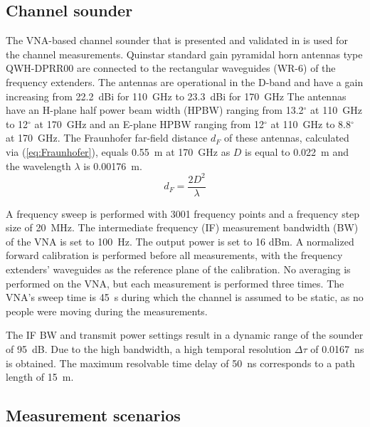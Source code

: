 \documentclass[preprint]{rsl}
\begin{document}
\subsection{Channel sounder}

The VNA-based channel sounder that is presented and validated in \cite{DeBeelde2021_eucap} is used for the channel measurements.
Quinstar standard gain pyramidal horn antennas type QWH-DPRR00 are connected to the rectangular waveguides (WR-6) of the frequency extenders. 
The antennas are operational in the D-band and have a gain increasing from 22.2~dBi for 110~GHz to 23.3~dBi for 170~GHz
The antennas have an H-plane half power beam width (HPBW) ranging from 13.2$^{\circ}$ at 110~GHz to 12$^{\circ}$ at 170~GHz and an E-plane HPBW ranging from 12$^{\circ}$ at 110~GHz to 8.8$^{\circ}$ at 170~GHz. 
The Fraunhofer far-field distance $d_F$ of these antennas, calculated via (\ref{eq:Fraunhofer}), equals 0.55~m at 170~GHz as $D$ is equal to 0.022~m and the wavelength $\lambda$ is 0.00176~m.
\begin{equation}
\label{eq:Fraunhofer}
d_F = \frac{2 D^2}{\lambda}
\end{equation}

A frequency sweep is performed with 3001 frequency points and a frequency step size of 20~MHz. 
The intermediate frequency (IF) measurement bandwidth (BW) of the VNA is set to 100~Hz. 
The output power is set to 16 dBm.
A normalized forward calibration is performed before all measurements, with the frequency extenders' waveguides as the reference plane of the calibration. 
No averaging is performed on the VNA, but each measurement is performed three times.
The VNA's sweep time is 45~s during which the channel is assumed to be static, as no people were moving during the measurements. 

The IF BW and transmit power settings result in a dynamic range of the sounder of 95~dB.
Due to the high bandwidth, a high temporal resolution $\Delta\tau$ of 0.0167~ns is obtained.
The maximum resolvable time delay of 50~ns corresponds to a path length of 15~m.

\subsection{Measurement scenarios}
\end{document}
